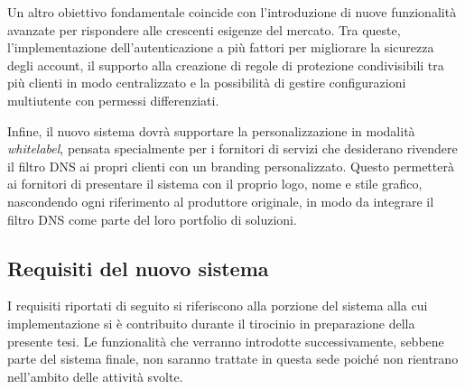 Un altro obiettivo fondamentale coincide con l'introduzione di nuove funzionalità avanzate per rispondere alle crescenti esigenze del mercato. Tra queste, l’implementazione dell’autenticazione a più fattori per migliorare la sicurezza degli account, il supporto alla creazione di regole di protezione condivisibili tra più clienti in modo centralizzato e la possibilità di gestire configurazioni multiutente con permessi differenziati.

Infine, il nuovo sistema dovrà supportare la personalizzazione in modalità \emph{whitelabel}, pensata specialmente per i fornitori di servizi che desiderano rivendere il filtro DNS ai propri clienti con un branding personalizzato. Questo permetterà ai fornitori di presentare il sistema con il proprio logo, nome e stile grafico, nascondendo ogni riferimento al produttore originale, in modo da integrare il filtro DNS come parte del loro portfolio di soluzioni.

\subsection{Requisiti del nuovo sistema}
I requisiti riportati di seguito si riferiscono alla porzione del sistema alla cui implementazione si è contribuito durante il tirocinio in preparazione della presente tesi. Le funzionalità che verranno introdotte successivamente, sebbene parte del sistema finale, non saranno trattate in questa sede poiché non rientrano nell’ambito delle attività svolte.

